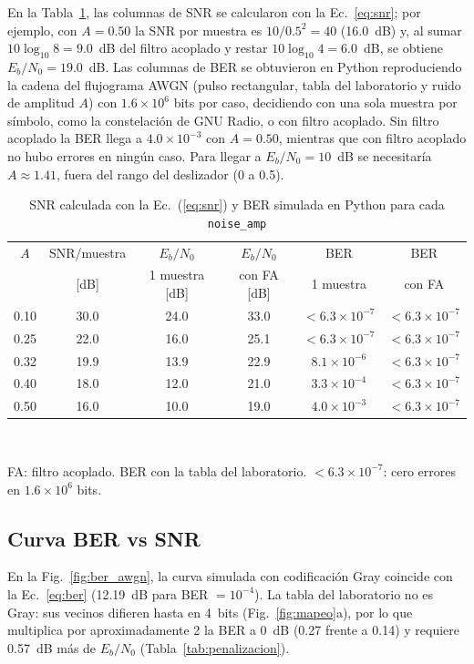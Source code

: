 \documentclass[twocolumn]{IEEEtran}
\begin{document}
En la Tabla~\ref{tab:noiseamp}, las columnas de SNR se calcularon con la Ec.~\eqref{eq:snr}; por ejemplo, con $A=0.50$ la SNR por muestra es $10/0.5^2 = 40$ (16.0~dB) y, al sumar $10\log_{10}8 = 9.0$~dB del filtro acoplado y restar $10\log_{10}4 = 6.0$~dB, se obtiene $E_b/N_0 = 19.0$~dB. Las columnas de BER se obtuvieron en Python reproduciendo la cadena del flujograma AWGN (pulso rectangular, tabla del laboratorio y ruido de amplitud $A$) con $1.6\times10^6$ bits por caso, decidiendo con una sola muestra por símbolo, como la constelación de GNU Radio, o con filtro acoplado. Sin filtro acoplado la BER llega a $4.0\times10^{-3}$ con $A=0.50$, mientras que con filtro acoplado no hubo errores en ningún caso. Para llegar a $E_b/N_0=10$~dB se necesitaría $A\approx1.41$, fuera del rango del deslizador (0 a 0.5).

\begin{table}[!ht]
\centering
\caption{SNR calculada con la Ec.~(\ref{eq:snr}) y BER simulada en Python para cada \texttt{noise\_amp}}
\label{tab:noiseamp}
\scriptsize
\setlength{\tabcolsep}{2pt}
\begin{tabular}{cccccc}
\toprule
$A$ & SNR/muestra & $E_b/N_0$ & $E_b/N_0$ & BER & BER \\
 & [dB] & 1 muestra [dB] & con FA [dB] & 1 muestra & con FA \\
\midrule
0.10 & 30.0 & 24.0 & 33.0 & $<6.3\times10^{-7}$ & $<6.3\times10^{-7}$ \\
0.25 & 22.0 & 16.0 & 25.1 & $<6.3\times10^{-7}$ & $<6.3\times10^{-7}$ \\
0.32 & 19.9 & 13.9 & 22.9 & $8.1\times10^{-6}$ & $<6.3\times10^{-7}$ \\
0.40 & 18.0 & 12.0 & 21.0 & $3.3\times10^{-4}$ & $<6.3\times10^{-7}$ \\
0.50 & 16.0 & 10.0 & 19.0 & $4.0\times10^{-3}$ & $<6.3\times10^{-7}$ \\
\bottomrule
\end{tabular}\\[1mm]
\parbox{0.95\linewidth}{\scriptsize FA: filtro acoplado. BER con la tabla del laboratorio. $<6.3\times10^{-7}$: cero errores en $1.6\times10^6$ bits.}
\end{table}

\subsection{Curva BER vs SNR}

En la Fig.~\ref{fig:ber_awgn}, la curva simulada con codificación Gray coincide con la Ec.~\eqref{eq:ber} (12.19~dB para BER $=10^{-4}$). La tabla del laboratorio no es Gray: sus vecinos difieren hasta en 4~bits (Fig.~\ref{fig:mapeo}a), por lo que multiplica por aproximadamente 2 la BER a 0~dB (0.27 frente a 0.14) y requiere 0.57~dB más de $E_b/N_0$ (Tabla~\ref{tab:penalizacion}).
\end{document}
